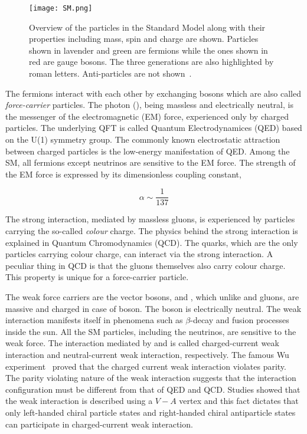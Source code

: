\begin{figure}[htbp]
    \centering
    \texttt{[image: SM.png]}
    \caption[Standard Model of Particle Physics]{Overview of the particles in the Standard Model 
    along with their properties including mass, spin and charge are shown. Particles shown in lavender 
    and green are fermions while the ones shown in red are gauge bosons. The three generations
    are also highlighted by roman letters. Anti-particles are not shown~\cite{SM}.}%
    \label{fig:SM}
\end{figure}

The fermions interact with each other by exchanging bosons which are also called 
\textit{force-carrier} particles. The photon (\Pphoton), being massless and electrically 
neutral, is the messenger of the electromagnetic (EM) force, experienced only by charged particles.
The underlying QFT is called Quantum Electrodynamices (QED) based on the U(1) symmetry group. The
commonly known electrostatic attraction between charged particles is the low-energy manifestation of QED. Among 
the SM, all fermions except neutrinos are sensitive to the EM force. The strength of the EM force
is expressed by its dimensionless coupling constant,

\begin{equation}
    \alpha \sim \frac{1}{137}
\end{equation}

The strong interaction, mediated by massless gluons, is experienced by particles 
carrying the so-called \textit{colour} charge. The physics behind the strong interaction is 
explained in Quantum Chromodynamics (QCD). The quarks, which are the only particles carrying colour charge,
can interact via the strong interaction. A peculiar thing in QCD is that the gluons themselves also 
carry colour charge. This property is unique for a force-carrier particle. 

The weak force carriers are the vector bosons, \PWpm and \PZ, which unlike \Pphoton and 
gluons, are massive and charged in case of \PWpm boson. The \PZ boson is electrically neutral. The weak
interaction manifests itself in phenomena such as $\beta$-decay and fusion processes inside the sun. All the
SM particles, including the neutrinos, are sensitive to the weak force. 
The interaction mediated by \PWpm and \PZ is called charged-current weak interaction and
neutral-current weak interaction, respectively. The famous Wu experiment~\cite{Wu:1957my} proved that 
the charged current weak interaction violates parity. The parity violating nature of the weak interaction
suggests that the interaction configuration must be different from that of QED and QCD. Studies showed that
the weak interaction is described using a $V-A$ vertex and this fact dictates that only left-handed
chiral particle states and right-handed chiral antiparticle states can participate in 
charged-current weak interaction. 

